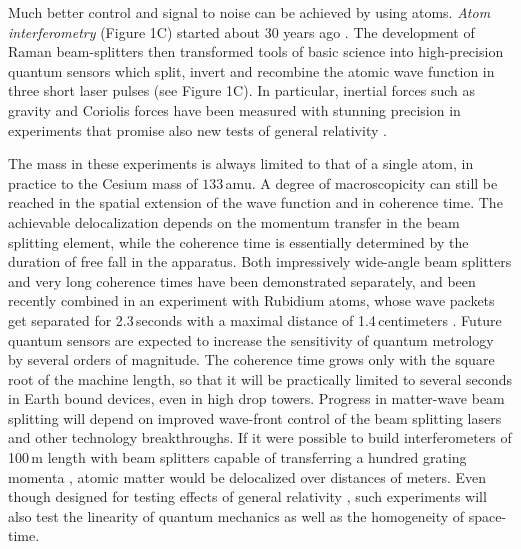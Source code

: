 \documentclass[11pt]{article}
\begin{document}
Much better control and signal to noise can be achieved by using atoms. 
\emph{Atom interferometry } (Figure 1C) started about 30 years ago \cite{Gould1986,Keith1988,Borde1989}.
The development of Raman \cite{Kasevich1991a} beam-splitters then  transformed tools of basic science into high-precision quantum sensors
which split, invert and recombine the atomic wave function in three short laser pulses (see Figure 1C).
In particular, inertial forces such as gravity and Coriolis forces\cite{Peters1999,Stockton2011} have been measured with stunning precision in experiments
that promise also new tests of general relativity \cite{Hohensee2011}.

The mass in these experiments is always limited to that of a single atom, in practice to the Cesium mass of $133$\,amu. A degree of macroscopicity can still be reached in the spatial extension of the wave function and in coherence time.
The achievable delocalization depends on the momentum transfer in the beam splitting element, while the coherence time is essentially determined by the duration of free fall
in the apparatus. Both impressively wide-angle beam splitters\cite{Mueller2008,Chiow2011} and very long coherence times \cite{Muentinga2013} have been demonstrated separately, and 
been recently combined in an experiment with Rubidium atoms, whose wave packets get separated for 2.3\,seconds with a maximal distance of 1.4\,centimeters \cite{Dickerson2013}.
Future quantum 
sensors are expected 
to increase the sensitivity of quantum metrology by several orders of magnitude.
The coherence time grows only with the square root of the machine length, so that it will be practically limited to several seconds in Earth bound devices, even in high drop towers. Progress in matter-wave beam splitting will depend on improved wave-front control of the beam splitting lasers and other technology breakthroughs.
If it were possible to build interferometers of 100\,m length with beam splitters capable of transferring 
a hundred grating momenta \cite{Dimopoulos2007},
atomic matter would be delocalized over 
distances of meters.
Even though designed for testing effects of general relativity \cite{Hohensee2011,Bouyer2010}, such experiments will also test the linearity of quantum mechanics\cite{Nimmrichter2013} as well as the homogeneity of space-time\cite{Percival1997}.
\end{document}
